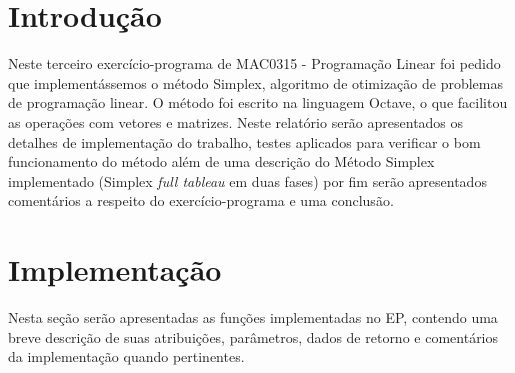 \documentclass[brazil,times]{abnt}
\begin{document}





\data{\today}

\capa

\folhaderosto


\section*{Introdução\label{cap:introducao}}
Neste terceiro exercício-programa de MAC0315 - Programação Linear foi pedido que implementássemos o método Simplex, algoritmo de otimização de problemas de programação linear. O método foi escrito na linguagem Octave, o que facilitou as operações com vetores e matrizes. Neste relatório serão apresentados os detalhes de implementação do trabalho, testes aplicados para verificar o bom funcionamento do método além de uma descrição do Método Simplex implementado (Simplex \emph{full tableau} em duas fases) por fim serão apresentados comentários a respeito do exercício-programa e uma conclusão.

\section*{Implementação}
Nesta seção serão apresentadas as funções implementadas no EP, contendo uma breve descrição de suas atribuições, parâmetros, dados de retorno e comentários da implementação quando pertinentes.
\end{document}
